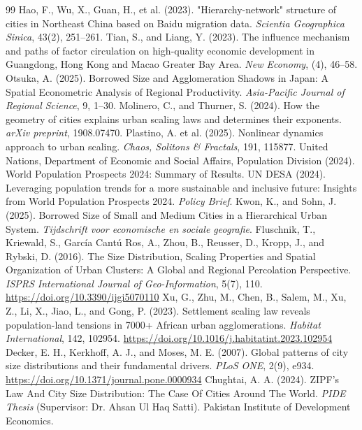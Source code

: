 \documentclass[11pt]{article}
\theoremstyle{remark}
\begin{document}
\begin{thebibliography}{99}
		Hao, F., Wu, X., Guan, H., et al. (2023). "Hierarchy-network" structure of cities in Northeast China based on Baidu migration data. \emph{Scientia Geographica Sinica}, 43(2), 251–261.
		Tian, S., and Liang, Y. (2023). The influence mechanism and paths of factor circulation on high-quality economic development in Guangdong, Hong Kong and Macao Greater Bay Area. \emph{New Economy}, (4), 46–58.
		Otsuka, A. (2025). Borrowed Size and Agglomeration Shadows in Japan: A Spatial Econometric Analysis of Regional Productivity. \emph{Asia-Pacific Journal of Regional Science}, 9, 1–30.
		Molinero, C., and Thurner, S. (2024). How the geometry of cities explains urban scaling laws and determines their exponents. \emph{arXiv preprint}, 1908.07470.
		Plastino, A. et al. (2025). Nonlinear dynamics approach to urban scaling. \emph{Chaos, Solitons \& Fractals}, 191, 115877.
		United Nations, Department of Economic and Social Affairs, Population Division (2024). World Population Prospects 2024: Summary of Results.
		UN DESA (2024). Leveraging population trends for a more sustainable and inclusive future: Insights from World Population Prospects 2024. \emph{Policy Brief}.
		Kwon, K., and Sohn, J. (2025). Borrowed Size of Small and Medium Cities in a Hierarchical Urban System. \emph{Tijdschrift voor economische en sociale geografie}.
		Fluschnik, T., Kriewald, S., García Cantú Ros, A., Zhou, B., Reusser, D., Kropp, J., and Rybski, D. (2016). The Size Distribution, Scaling Properties and Spatial Organization of Urban Clusters: A Global and Regional Percolation Perspective. \emph{ISPRS International Journal of Geo-Information}, 5(7), 110. \url{https://doi.org/10.3390/ijgi5070110}
		Xu, G., Zhu, M., Chen, B., Salem, M., Xu, Z., Li, X., Jiao, L., and Gong, P. (2023). Settlement scaling law reveals population-land tensions in 7000+ African urban agglomerations. \emph{Habitat International}, 142, 102954. \url{https://doi.org/10.1016/j.habitatint.2023.102954}
		Decker, E. H., Kerkhoff, A. J., and Moses, M. E. (2007). Global patterns of city size distributions and their fundamental drivers. \emph{PLoS ONE}, 2(9), e934. \url{https://doi.org/10.1371/journal.pone.0000934}
		Chughtai, A. A. (2024). ZIPF's Law And City Size Distribution: The Case Of Cities Around The World. \emph{PIDE Thesis} (Supervisor: Dr. Ahsan Ul Haq Satti). Pakistan Institute of Development Economics.

\end{thebibliography}
\end{document}
